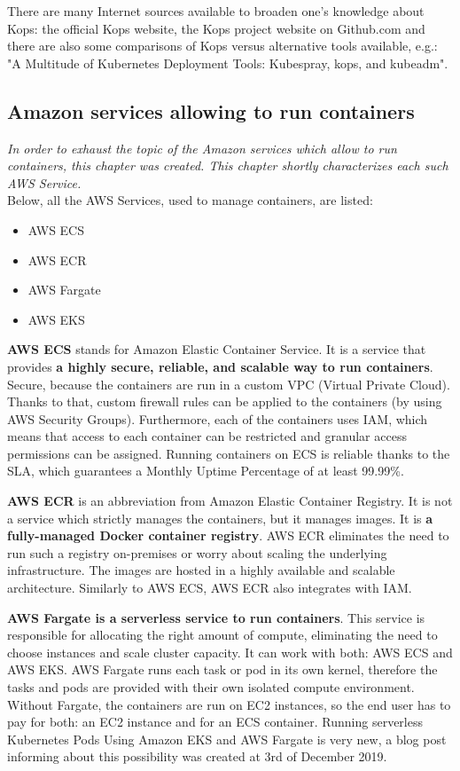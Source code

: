 There are many Internet sources available to broaden one's knowledge about Kops: the official Kops website\cite{online-kops}, the Kops project website on Github.com\cite{online-kops-gh} and there are also some comparisons of Kops versus alternative tools available, e.g.: "A Multitude of Kubernetes Deployment Tools: Kubespray, kops, and kubeadm"\cite{online-kops-blog}.

\subsection{Amazon services allowing to run containers}
\textit{In order to exhaust the topic of the Amazon services which allow to run containers, this chapter was created. This chapter shortly characterizes each such AWS Service.}
\\

Below, all the AWS Services, used to manage containers, are listed:
\begin{itemize}
\item AWS ECS
\item AWS ECR
\item AWS Fargate
\item AWS EKS
\end{itemize}

\textbf{AWS ECS} stands for Amazon Elastic Container Service. It is a service that provides \textbf{a highly secure, reliable, and scalable way to run containers}. Secure, because the containers are run in a custom VPC (Virtual Private Cloud). Thanks to that, custom firewall rules can be applied to the containers (by using AWS Security Groups). Furthermore, each of the containers uses IAM, which means that access to each container can be restricted and granular access permissions can be assigned. Running containers on ECS is reliable thanks to the SLA, which guarantees a Monthly Uptime Percentage of at least 99.99\%\cite{ecs}.

\textbf{AWS ECR} is an abbreviation from Amazon Elastic Container Registry. It is not a service which strictly manages the containers, but it manages images. It is \textbf{a fully-managed Docker container registry}. AWS ECR eliminates the need to run such a registry on-premises or worry about scaling the underlying infrastructure. The images are hosted in a highly available and scalable architecture. Similarly to AWS ECS, AWS ECR also integrates with IAM\cite{ecr}.

\textbf{AWS Fargate is a serverless service to run containers}. This service is responsible for allocating the right amount of compute, eliminating the need to choose instances and scale cluster capacity. It can work with both: AWS ECS and AWS EKS. AWS Fargate runs each task or pod in its own kernel, therefore the tasks and pods are provided with their own isolated compute environment. Without Fargate, the containers are run on EC2 instances, so the end user has to pay for both: an EC2 instance and for an ECS container\cite{fargate}. Running serverless Kubernetes Pods Using Amazon EKS and AWS Fargate is very new, a blog post informing about this possibility was created at 3rd of December 2019\cite{fargate-for-eks}.

